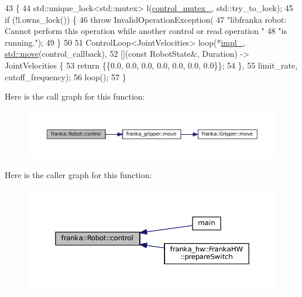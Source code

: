 \begin{DoxyCode}
43                                              \{
44   std::unique\_lock<std::mutex> l(\hyperlink{classfranka_1_1Robot_a719ad1fab76f8edfc9f6f761671c1375}{control\_mutex\_}, std::try\_to\_lock);
45   \textcolor{keywordflow}{if} (!l.owns\_lock()) \{
46     \textcolor{keywordflow}{throw} InvalidOperationException(
47         \textcolor{stringliteral}{"libfranka robot: Cannot perform this operation while another control or read operation "}
48         \textcolor{stringliteral}{"is running."});
49   \}
50 
51   ControlLoop<JointVelocities> loop(*\hyperlink{classfranka_1_1Robot_aca155054184e5b6478942fd6a1b82ba4}{impl\_}, \hyperlink{namespacefranka__gripper_a1356a87108d2229401d3755bd3e53bdf}{std::move}(control\_callback),
52                                     [](\textcolor{keyword}{const} RobotState&, Duration) -> JointVelocities \{
53                                       \textcolor{keywordflow}{return} \{\{0.0, 0.0, 0.0, 0.0, 0.0, 0.0, 0.0\}\};
54                                     \},
55                                     limit\_rate, cutoff\_frequency);
56   loop();
57 \}
\end{DoxyCode}
Here is the call graph for this function\+:
\nopagebreak
\begin{figure}[H]
\begin{center}
\leavevmode
\includegraphics[width=350pt]{classfranka_1_1Robot_a5b5ba0a4f2bfd20be963b05622e629e1_cgraph}
\end{center}
\end{figure}
Here is the caller graph for this function\+:
\nopagebreak
\begin{figure}[H]
\begin{center}
\leavevmode
\includegraphics[width=350pt]{classfranka_1_1Robot_a5b5ba0a4f2bfd20be963b05622e629e1_icgraph}
\end{center}
\end{figure}
\mbox{\label{classfranka_1_1Robot_a5f012ef276eb94d2a98a077bafb49bfe}} 
